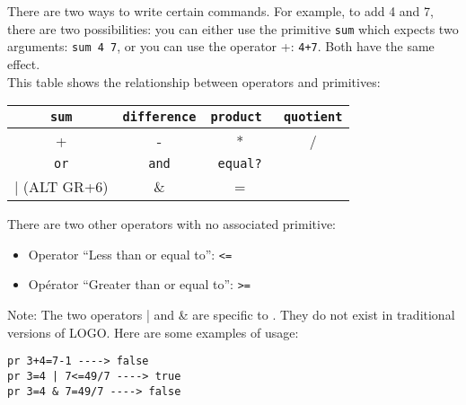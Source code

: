 There are two ways to write certain commands. For example, to add
4 and 7, there are two possibilities: you can either use the primitive
\texttt{sum} which expects two arguments: \texttt{sum 4 7}, or
you can use the operator +: \texttt{4+7}. Both have the same effect.\\
 This table shows the relationship between operators and primitives:\\
\begin{center}
\begin{tabular}{|c|c|c|c|}
\hline 
\texttt{sum}&
 \texttt{difference}&
 \texttt{product }&
 \texttt{quotient}\\
\hline
+ &
 - &
 {*} &
 / \\
\hline
\texttt{or}&
 \texttt{and}&
\texttt{equal?}&
\\
\hline
| (ALT GR+6) &
 \&&
=&
 \\
\hline
\end{tabular}             \end{center}
\vspace{0.25cm}
There are two other operators with no associated primitive:\begin{itemize}
 \item Operator ``Less than or equal to'': \texttt{<=}
\item Opérator ``Greater than or equal to'': \texttt{>=}
\end{itemize}
Note: The two operators | and \& are specific to \xlogo. They do not exist
in traditional versions of LOGO. Here are some examples of usage:

\begin{verbatim}
pr 3+4=7-1 ----> false
pr 3=4 | 7<=49/7 ----> true
pr 3=4 & 7=49/7 ----> false
\end{verbatim}